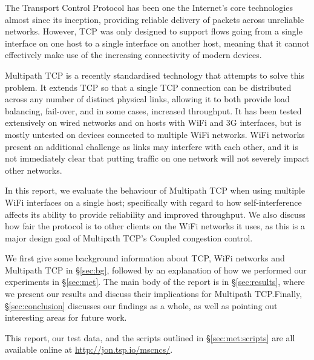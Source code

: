 The Transport Control Protocol has been one the Internet's core technologies
almost since its inception, providing reliable delivery of packets across
unreliable networks. However, TCP was only designed to support flows going from
a single interface on one host to a single interface on another host, meaning
that it cannot effectively make use of the increasing connectivity of modern
devices.

Multipath TCP is a recently standardised technology that attempts to solve this
problem. It extends TCP so that a single TCP connection can be distributed
across any number of distinct physical links, allowing it to both provide load
balancing, fail-over, and in some cases, increased throughput. It has been
tested extensively on wired networks and on hosts with WiFi and 3G interfaces,
but is mostly untested on devices connected to multiple WiFi networks. WiFi
networks present an additional challenge as links may interfere with each other,
and it is not immediately clear that putting traffic on one network will not
severely impact other networks.

In this report, we evaluate the behaviour of Multipath TCP when using multiple
WiFi interfaces on a single host; specifically with regard to how
self-interference affects its ability to provide reliability and improved
throughput. We also discuss how fair the protocol is to other clients on the
WiFi networks it uses, as this is a major design goal of Multipath TCP's Coupled
congestion control.

We first give some background information about TCP, WiFi networks and Multipath
TCP in \S\ref{sec:bg}, followed by an explanation of how we performed our
experiments in \S\ref{sec:met}. The main body of the report is in
\S\ref{sec:results}, where we present our results and discuss their implications
for Multipath TCP.\@ Finally, \S\ref{sec:conclusion} discusses our findings as a
whole, as well as pointing out interesting areas for future work.

This report, our test data, and the scripts outlined in \S\ref{sec:met:scripts}
are all available online at \url{http://jon.tsp.io/mscncs/}.
